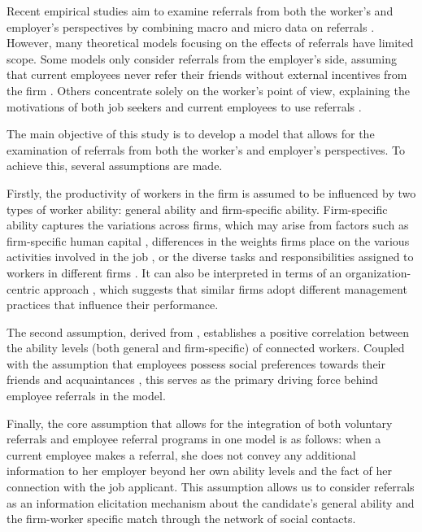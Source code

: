 \documentclass[12pt]{article}
\begin{document}
Recent empirical studies aim to examine referrals from both the worker's and employer's perspectives by combining macro and micro data on referrals \citep{levati2020impact, lester2021heterogeneous}. However, many theoretical models focusing on the effects of referrals have limited scope. Some models only consider referrals from the employer's side, assuming that current employees never refer their friends without external incentives from the firm \citep{ekinci2016employee}. Others concentrate solely on the worker's point of view, explaining the motivations of both job seekers and current employees to use referrals \citep{lester2021heterogeneous}.

The main objective of this study is to develop a model that allows for the examination of referrals from both the worker's and employer's perspectives. To achieve this, several assumptions are made. 

Firstly, the productivity of workers in the firm is assumed to be influenced by two types of worker ability: general ability and firm-specific ability. Firm-specific ability captures the variations across firms, which may arise from factors such as firm-specific human capital \citep{becker1962investment, becker1975investment}, differences in the weights firms place on the various activities involved in the job \citep{lazear2009firm}, or the diverse tasks and responsibilities assigned to workers in different firms \citep{gibbons2004task}. It can also be interpreted in terms of an organization-centric approach \citep{bloom2019drives, dessein2022organizational}, which suggests that similar firms adopt different management practices that influence their performance.

The second assumption, derived from \cite{montgomery1991social}, establishes a positive correlation between the ability levels (both general and firm-specific) of connected workers. Coupled with the assumption that employees possess social preferences towards their friends and acquaintances \citep{bandiera2009social, friebel2023employee}, this serves as the primary driving force behind employee referrals in the model.

Finally, the core assumption that allows for the integration of both voluntary referrals and employee referral programs in one model is as follows: when a current employee makes a referral, she does not convey any additional information to her employer beyond her own ability levels and the fact of her connection with the job applicant. This assumption allows us to consider referrals as an information elicitation mechanism about the candidate's general ability and the firm-worker specific match through the network of social contacts.
\end{document}
